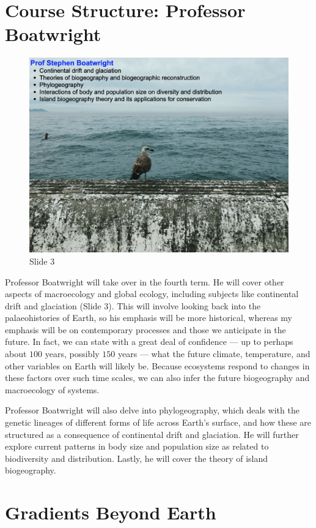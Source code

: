 \documentclass[
  10pt,
]{book}
\begin{document}
\section{Course Structure: Professor
Boatwright}\label{course-structure-professor-boatwright}

\begin{figure}[ht]
\centering
\includegraphics[width=0.8\linewidth]{../images/BDC334/BDC334-003.jpeg}
\caption*{Slide 3}
\end{figure}

Professor Boatwright will take over in the fourth term. He will cover
other aspects of macroecology and global ecology, including subjects
like continental drift and glaciation (Slide 3). This will involve
looking back into the palaeohistories of Earth, so his emphasis will be
more historical, whereas my emphasis will be on contemporary processes
and those we anticipate in the future. In fact, we can state with a
great deal of confidence --- up to perhaps about \(100\) years, possibly
\(150\) years --- what the future climate, temperature, and other
variables on Earth will likely be. Because ecosystems respond to changes
in these factors over such time scales, we can also infer the future
biogeography and macroecology of systems.

Professor Boatwright will also delve into phylogeography, which deals
with the genetic lineages of different forms of life across Earth's
surface, and how these are structured as a consequence of continental
drift and glaciation. He will further explore current patterns in body
size and population size as related to biodiversity and distribution.
Lastly, he will cover the theory of island biogeography.

\section{Gradients Beyond Earth}\label{gradients-beyond-earth}
\end{document}
